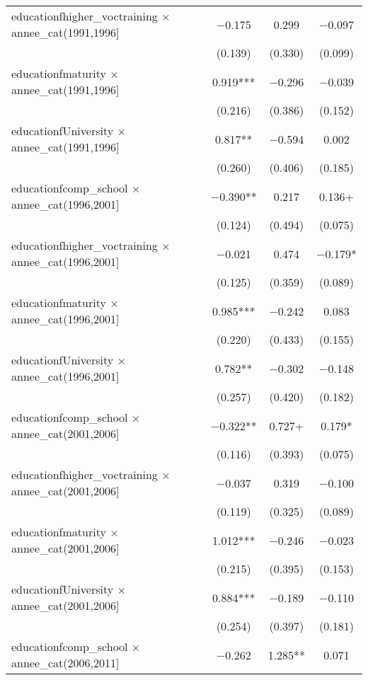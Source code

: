 \begin{table}
\begin{tabular}[t]{lccc}
educationfhigher\_voctraining × annee\_cat(1991,1996] & \num{-0.175} & \num{0.299} & \num{-0.097}\\
 & (\num{0.139}) & (\num{0.330}) & (\num{0.099})\\
educationfmaturity × annee\_cat(1991,1996] & \num{0.919}*** & \num{-0.296} & \num{-0.039}\\
 & (\num{0.216}) & (\num{0.386}) & (\num{0.152})\\
educationfUniversity × annee\_cat(1991,1996] & \num{0.817}** & \num{-0.594} & \num{0.002}\\
 & (\num{0.260}) & (\num{0.406}) & (\num{0.185})\\
educationfcomp\_school × annee\_cat(1996,2001] & \num{-0.390}** & \num{0.217} & \num{0.136}+\\
 & (\num{0.124}) & (\num{0.494}) & (\num{0.075})\\
educationfhigher\_voctraining × annee\_cat(1996,2001] & \num{-0.021} & \num{0.474} & \num{-0.179}*\\
 & (\num{0.125}) & (\num{0.359}) & (\num{0.089})\\
educationfmaturity × annee\_cat(1996,2001] & \num{0.985}*** & \num{-0.242} & \num{0.083}\\
 & (\num{0.220}) & (\num{0.433}) & (\num{0.155})\\
educationfUniversity × annee\_cat(1996,2001] & \num{0.782}** & \num{-0.302} & \num{-0.148}\\
 & (\num{0.257}) & (\num{0.420}) & (\num{0.182})\\
educationfcomp\_school × annee\_cat(2001,2006] & \num{-0.322}** & \num{0.727}+ & \num{0.179}*\\
 & (\num{0.116}) & (\num{0.393}) & (\num{0.075})\\
educationfhigher\_voctraining × annee\_cat(2001,2006] & \num{-0.037} & \num{0.319} & \num{-0.100}\\
 & (\num{0.119}) & (\num{0.325}) & (\num{0.089})\\
educationfmaturity × annee\_cat(2001,2006] & \num{1.012}*** & \num{-0.246} & \num{-0.023}\\
 & (\num{0.215}) & (\num{0.395}) & (\num{0.153})\\
educationfUniversity × annee\_cat(2001,2006] & \num{0.884}*** & \num{-0.189} & \num{-0.110}\\
 & (\num{0.254}) & (\num{0.397}) & (\num{0.181})\\
educationfcomp\_school × annee\_cat(2006,2011] & \num{-0.262} & \num{1.285}** & \num{0.071}\\

\end{tabular}
\end{table}
